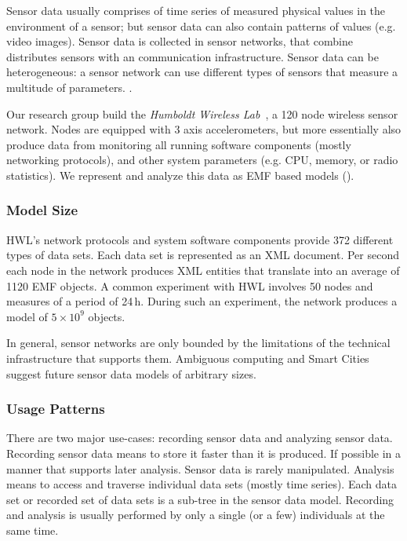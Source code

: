 Sensor data usually comprises of time series of measured physical values in the environment of a sensor; but sensor data can also contain patterns of values (e.g. video images). Sensor data is collected in sensor networks, that combine distributes sensors with an communication infrastructure. Sensor data can be heterogeneous: a sensor network can use different types of sensors that measure a multitude of parameters. \cite{estrin,lynch}. 

Our research group build the \emph{Humboldt Wireless Lab}~\cite{hwl}, a 120 node wireless sensor network. Nodes are equipped with 3 axis accelerometers, but more essentially also produce data from monitoring all running software components (mostly networking protocols), and other system parameters (e.g. CPU, memory, or radio statistics). We represent and analyze this data as EMF based models (\cite{clickwatch}).

\subsubsection*{Model Size}
HWL's network protocols and system software components provide 372 different types of data sets. Each data set is represented as an XML document. Per second each node in the network produces XML entities that translate into an average of 1120 EMF objects. A common experiment with HWL involves 50 nodes and measures of a period of 24\,h. During such an experiment, the network produces a model of $5\times 10^9$ objects. 

In general, sensor networks are only bounded by the limitations of the technical infrastructure that supports them. Ambiguous computing and Smart Cities suggest future sensor data models of arbitrary sizes. 

\subsubsection*{Usage Patterns}
There are two major use-cases: recording sensor data and analyzing sensor data. Recording sensor data means to store it faster than it is produced. If possible in a manner that supports later analysis. Sensor data is rarely manipulated. Analysis means to access and traverse individual data sets (mostly time series). Each data set or recorded set of data sets is a sub-tree in the sensor data model. Recording and analysis is usually performed by only a single (or a few) individuals at the same time. 

